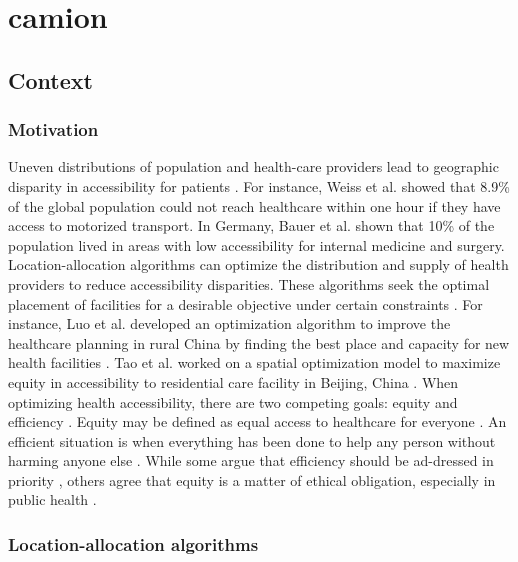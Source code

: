 \chapter{\acf{camion}}

\section{Context}

\subsection{Motivation}

Uneven distributions of population and health-care providers lead to geographic
disparity in accessibility for patients \cite{wang_why_2020}. For instance,
Weiss et al. \cite{weiss_global_2020} showed that 8.9\% of the global population
could not reach healthcare within one hour if they have access to motorized
transport. In Germany, Bauer et al. \cite{bauer_spatial_2020} shown that 10\% of
the population lived in areas with low accessibility for internal medicine and
surgery. Location-allocation algorithms \cite{church_location_1999} can optimize
the distribution and supply of health providers to reduce accessibility
disparities. These algorithms seek the optimal placement of facilities for a
desirable objective under certain constraints \cite{wang_measurement_2012}. For
instance, Luo et al. developed an optimization algorithm to improve the
healthcare planning in rural China by finding the best place and capacity for
new health facilities \cite{luo_integrating_2014}. Tao et al. worked on a
spatial optimization model to maximize equity in accessibility to residential
care facility in Beijing, China \cite{tao_spatial_2014}. When optimizing health
accessibility, there are two competing goals: equity and efficiency
\cite{krugman_opinion_2013,meyer_equity_2008}. Equity may be defined as equal
access to healthcare for everyone \cite{culyer_equity_1993}. An efficient
situation is when everything has been done to help any person without harming
anyone else \cite{hemenway_optimal_1982}. While some argue that efficiency
should be ad-dressed in priority \cite{hemenway_optimal_1982}, others agree that
equity is a matter of ethical obligation, especially in public health
\cite{fried_rights_1975, oliver_equity_2004}.

\subsection{Location-allocation algorithms}

